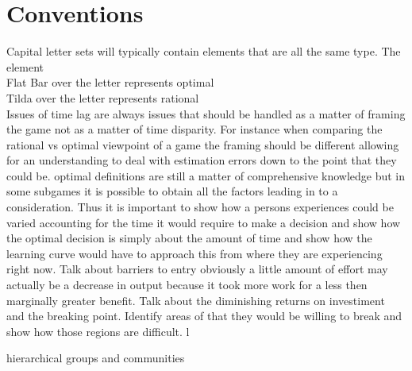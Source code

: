 \documentclass[]{article}
\begin{document}
\section*{Conventions}
Capital letter sets will typically contain elements that are all the same type. The element
\\ Flat Bar over the letter represents optimal
\\ Tilda over the letter represents rational 
\\ Issues of time lag are always issues that should be handled as a matter of framing the game not as a matter of time disparity. For instance when comparing the rational vs optimal viewpoint of a game the framing should be different allowing for an understanding to deal with estimation errors down to the point that they could be. optimal definitions are still a matter of comprehensive knowledge but in some subgames it is possible to obtain all the factors leading in to a consideration. Thus it is important to show how a persons experiences could be varied accounting for the time it would require to make a decision and show how the optimal decision is simply about the amount of time and show how the learning curve would have to approach this from where they are experiencing right now. Talk about barriers to entry obviously a little amount of effort may actually be a decrease in output because it took more work for a less then marginally greater benefit. Talk about the diminishing returns on investiment and the breaking point. Identify areas of that they would be willing to break and show how those regions are difficult. l   

hierarchical groups and  communities
\end{document}
